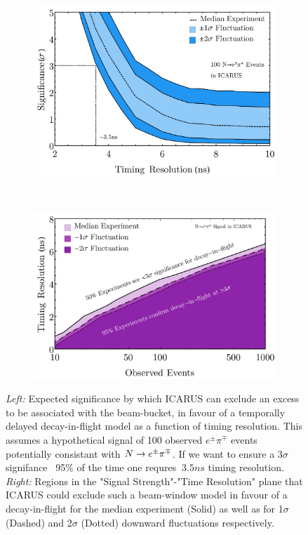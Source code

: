 \documentclass[11pt, a4paper]{article}
\def\ster{\ensuremath N}
\begin{document}
\begin{figure}[t]
\center
\begin{subfigure}[t]{0.5\textwidth}
\includegraphics[width=\textwidth]{figures/hockey_plot.pdf}
\end{subfigure}%
~
\begin{subfigure}[t]{0.5\textwidth}
\includegraphics[width=\textwidth]{figures/icarus_contour.pdf}
\end{subfigure}
\caption{\label{fig:hockey}
\emph{Left:} Expected significance by which ICARUS can exclude an excess to be associated with the beam-bucket, in favour of a temporally delayed decay-in-flight model as a function of timing resolution. This assumes a hypothetical signal of 100 observed $e^\pm \pi^\mp$ events potentially consistant with $\ster \rightarrow e^\pm \pi^\mp$. If we want to ensure a $3\sigma$ signifance ~95\% of the time one requres $~3.5ns$ timing resolution. \emph{Right:} Regions in the "Signal Strength"-"Time Resolution" plane that ICARUS could exclude such a beam-window model in favour of a decay-in-flight for the median experiment (Solid) as well as for 1$\sigma$ (Dashed) and 2$\sigma$ (Dotted) downward fluctuations respectively.}

\end{figure}
\end{document}
